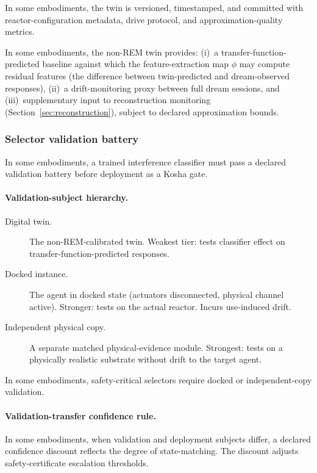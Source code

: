 \documentclass[a4paper,12pt]{article}
\begin{document}
In some embodiments, the twin is versioned, timestamped, and
committed with reactor-configuration metadata, drive protocol, and
approximation-quality metrics.

In some embodiments, the non-REM twin provides: (i)~a
transfer-function-predicted baseline against which the
feature-extraction map $\phi$ may compute residual features (the
difference between twin-predicted and dream-observed responses),
(ii)~a drift-monitoring proxy between full dream sessions, and
(iii)~supplementary input to reconstruction monitoring
(Section~\ref{sec:reconstruction}), subject to declared
approximation bounds.

\subsubsection{Selector validation battery}
\label{sec:selector-validation}

In some embodiments, a trained interference classifier must pass a
declared validation battery before deployment as a Kosha gate.

\paragraph{Validation-subject hierarchy.}
\begin{description}
  \item[Digital twin.] The non-REM-calibrated twin. Weakest tier:
    tests classifier effect on transfer-function-predicted responses.
  \item[Docked instance.] The agent in docked state (actuators
    disconnected, physical channel active). Stronger: tests on the
    actual reactor. Incurs use-induced drift.
  \item[Independent physical copy.] A separate matched
    physical-evidence module. Strongest: tests on a physically
    realistic substrate without drift to the target agent.
\end{description}

In some embodiments, safety-critical selectors require docked or
independent-copy validation.

\paragraph{Validation-transfer confidence rule.}
In some embodiments, when validation and deployment subjects differ,
a declared confidence discount reflects the degree of state-matching.
The discount adjusts safety-certificate escalation thresholds.
\end{document}
